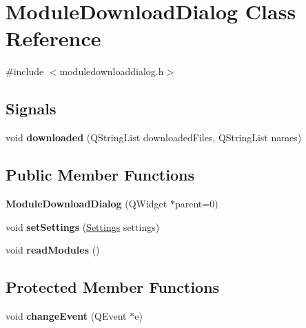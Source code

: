\hypertarget{classModuleDownloadDialog}{
\section{ModuleDownloadDialog Class Reference}
\label{classModuleDownloadDialog}
}


{\ttfamily \#include $<$moduledownloaddialog.h$>$}\subsection*{Signals}
\begin{DoxyCompactItemize}
\item 
\hypertarget{classModuleDownloadDialog_a285d9619e209258c79f40dc34b8682d4}{
void {\bfseries downloaded} (QStringList downloadedFiles, QStringList names)}
\label{classModuleDownloadDialog_a285d9619e209258c79f40dc34b8682d4}

\end{DoxyCompactItemize}
\subsection*{Public Member Functions}
\begin{DoxyCompactItemize}
\item 
\hypertarget{classModuleDownloadDialog_a893c5c6dfa7680361af886502a0f80e3}{
{\bfseries ModuleDownloadDialog} (QWidget $\ast$parent=0)}
\label{classModuleDownloadDialog_a893c5c6dfa7680361af886502a0f80e3}

\item 
\hypertarget{classModuleDownloadDialog_a471587fb7073ab5113bfed9f46aca5f7}{
void {\bfseries setSettings} (\hyperlink{classSettings}{Settings} settings)}
\label{classModuleDownloadDialog_a471587fb7073ab5113bfed9f46aca5f7}

\item 
\hypertarget{classModuleDownloadDialog_af63cad20b2af821018617fb49f2c3e77}{
void {\bfseries readModules} ()}
\label{classModuleDownloadDialog_af63cad20b2af821018617fb49f2c3e77}

\end{DoxyCompactItemize}
\subsection*{Protected Member Functions}
\begin{DoxyCompactItemize}
\item 
\hypertarget{classModuleDownloadDialog_a6b1d8ab0687323e33b28ed53a9f1f341}{
void {\bfseries changeEvent} (QEvent $\ast$e)}
\label{classModuleDownloadDialog_a6b1d8ab0687323e33b28ed53a9f1f341}

\end{DoxyCompactItemize}


